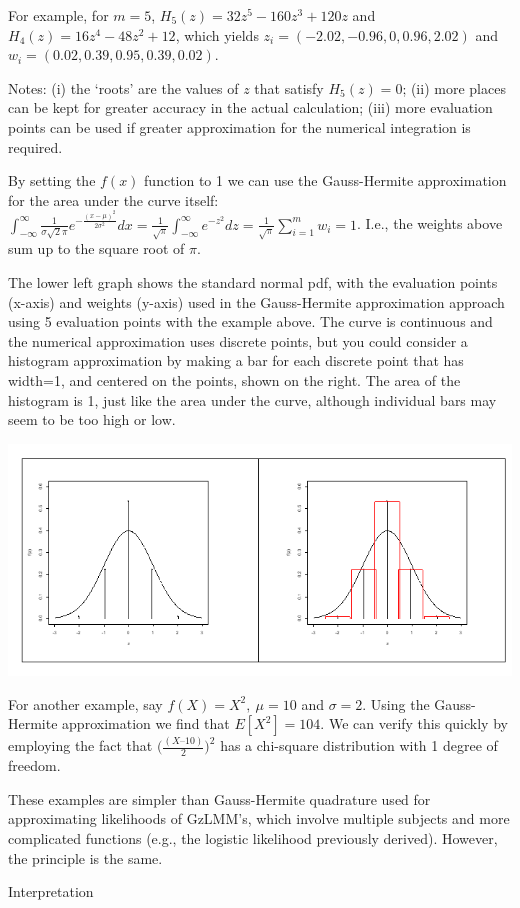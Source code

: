 \documentclass[
  9pt,
  ignorenonframetext,
]{beamer}
\begin{document}
\begin{frame}{}
\protect\hypertarget{section-11}{}
For example, for \(m=5\), \(H_5 (z)= 32 z^5-160z^3+120z\) and
\(H_4(z)=16z^4-48z^2+12\), which yields
\(z_i=(-2.02, -0.96, 0, 0.96, 2.02)\) and
\(w_i=(0.02, 0.39, 0.95, 0.39, 0.02)\).

Notes: (i) the `roots' are the values of \(z\) that satisfy
\(H_5(z)=0\); (ii) more places can be kept for greater accuracy in the
actual calculation; (iii) more evaluation points can be used if greater
approximation for the numerical integration is required.

By setting the \(f(x)\) function to 1 we can use the Gauss-Hermite
approximation for the area under the curve itself:
\(\int_{-\infty }^\infty \frac 1 {\sigma \sqrt {2}\pi} e^{- \frac {(x-\mu)^2} {2\sigma ^2 }} dx= \frac 1 {\sqrt {\pi}} \int_{-\infty }^\infty e^{-z^2} dz=\frac 1 {\sqrt {\pi}} \sum _{i=1}^mw_i =1\).
I.e., the weights above sum up to the square root of \(\pi\).
\end{frame}

\begin{frame}{}
\protect\hypertarget{section-12}{}
The lower left graph shows the standard normal pdf, with the evaluation
points (x-axis) and weights (y-axis) used in the Gauss-Hermite
approximation approach using 5 evaluation points with the example above.
The curve is continuous and the numerical approximation uses discrete
points, but you could consider a histogram approximation by making a bar
for each discrete point that has width=1, and centered on the points,
shown on the right. The area of the histogram is 1, just like the area
under the curve, although individual bars may seem to be too high or
low.

\begin{center}\includegraphics[width=0.7\linewidth]{figs_L15/f5} \end{center}
\end{frame}

\begin{frame}{}
\protect\hypertarget{section-13}{}
For another example, say \(f(X)=X^2,\ \mu=10\) and \(\sigma =2\). Using
the Gauss-Hermite approximation we find that \(E[X^2]=104\). We can
verify this quickly by employing the fact that
\(\Big(\frac {(X–10)} 2\Big)^2\) has a chi-square distribution with 1
degree of freedom.

These examples are simpler than Gauss-Hermite quadrature used for
approximating likelihoods of GzLMM's, which involve multiple subjects
and more complicated functions (e.g., the logistic likelihood previously
derived). However, the principle is the same.

Interpretation
\end{frame}
\end{document}
